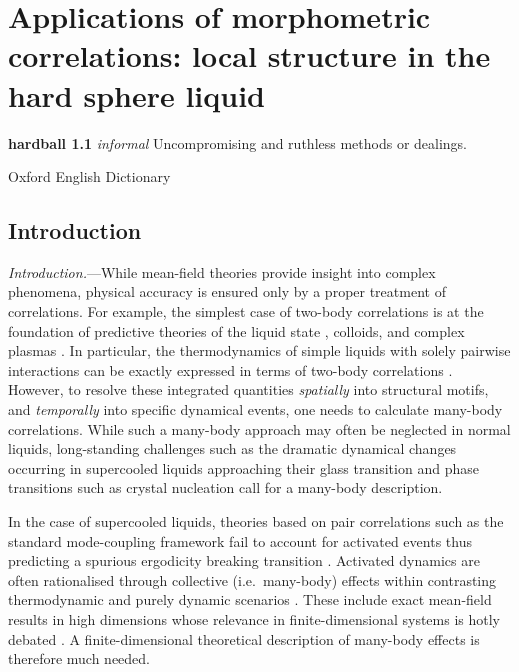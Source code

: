 \documentclass[11pt,twoside]{report}
\begin{document}
\chapter{Applications of morphometric correlations: local structure in the hard sphere liquid}
\epigraph{\textbf{hardball 1.1} \emph{informal} Uncompromising and ruthless methods or dealings.}{Oxford English Dictionary}
\label{chapter:morphometric-applications}

\section{Introduction}

\emph{Introduction.}---While mean-field theories provide insight into complex phenomena, physical accuracy is ensured only by a proper treatment of correlations.
For example, the simplest case of two-body correlations is at the foundation of predictive theories of the liquid state \cite{Hansen2013}, colloids, and complex plasmas \cite{likos2001,Ivlev2012}.
In particular, the thermodynamics of simple liquids with solely pairwise interactions can be exactly expressed in terms of two-body correlations \cite{Hansen2013}. However, to resolve these integrated quantities \emph{spatially} into structural motifs, and \emph{temporally} into specific dynamical events, one needs to calculate many-body correlations.
While such a many-body approach may often be neglected in normal liquids, long-standing challenges such as the dramatic dynamical changes occurring in supercooled liquids approaching their glass transition \cite{Berthier2011,Royall2015} and phase transitions such as crystal nucleation \cite{Russo2012} call for a many-body description.

In the case of supercooled liquids, theories based on pair correlations such as the standard mode-coupling framework \cite{goetze} fail to account for activated events thus predicting a spurious ergodicity breaking transition \cite{Brambilla2009,Hallett2018}.
Activated dynamics are often rationalised through collective (i.e.\ many-body) effects within contrasting thermodynamic and purely dynamic scenarios \cite{Lubchenko2007,Tarjus2005,Biroli2006,Janssen2015,Szamel2013,Chandler2010}.
These include exact mean-field results in high dimensions \cite{Parisi2010,Charbonneau2017} whose relevance in finite-dimensional systems is hotly debated \cite{Wyart2017}.
A finite-dimensional theoretical description of many-body effects is therefore much needed.
\end{document}
